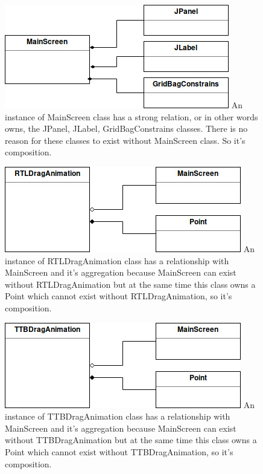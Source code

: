 \documentclass{article}
\begin{document}
\begin{figure}[H]
\includegraphics[scale=1]{Images/MainScreen.jpg} 
An instance of MainScreen class has a strong relation, or in other words owns, the JPanel, JLabel, GridBagConstrains classes. There is no reason for these classes to exist without MainScreen class. So it's composition.
\end{figure}

\begin{figure}[H]
\includegraphics[scale=0.95]{Images/RTLDragAnimation.jpg} 
An instance of RTLDragAnimation class has a relationship with MainScreen and it's aggregation because MainScreen can exist without RTLDragAnimation but at the same time this class owns a Point which cannot exist without RTLDragAnimation, so it's composition.
\end{figure}

\begin{figure}[H]
\includegraphics[scale=0.95]{Images/TTBDragAnimation.jpg} 
An instance of TTBDragAnimation class has a relationship with MainScreen and it's aggregation because MainScreen can exist without TTBDragAnimation but at the same time this class owns a Point which cannot exist without TTBDragAnimation, so it's composition.
\end{figure}
\end{document}
